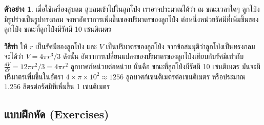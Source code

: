 \documentclass[
]{book}
\theoremstyle{definition}
\theoremstyle{definition}
\newtheorem{example}{ตัวอย่าง}[chapter]
\theoremstyle{definition}
\theoremstyle{definition}
\theoremstyle{remark}
\begin{document}
\begin{example}
เมื่อใช้เครื่องสูบลม สูบลมเข้าไปในลูกโป่ง เราอาจประมาณได้ว่า ณ ขณะเวลาใดๆ
ลูกโป่งมีรูปร่างเป็นรูปทรงกลม จงหาอัตราการเพิ่มขึ้นของปริมาตรของลูกโป่ง
ต่อหนึ่งหน่วยรัศมีที่เพิ่มขึ้นของลูกโป่ง ขณะที่ลูกโป่งมีรัศมี 10 เซนติเมตร
\end{example}

\textbf{วิธีทำ} ให้ \(r\) เป็นรัศมีของลูกโป่ง และ \(V\) เป็นปริมาตรของลูกโป่ง
จากข้อสมมุติว่าลูกโป่งเป็นทรงกลม จะได้ว่า \(V=4\pi r^3/3\) ดังนั้น
อัตราการเปลี่ยนแปลงของปริมาตรของลูกโป่งเทียบกับรัศมีเท่ากับ
\(\displaystyle\frac{dV}{dr}=12\pi r^2/3=4\pi r^2\) ลูกบาศก์หน่วยต่อหน่วย นั่นคือ
ขณะที่ลูกโป่งมีรัศมี 10 เซนติเมตร มันจะมีปริมาตรเพิ่มขึ้นในอัตรา
\(4\times\pi\times10^2\approx1256\) ลูกบาศก์เซนติเมตรต่อเซนติเมตร หรือประมาณ
\(1.256\) ลิตรต่อรัศมีที่เพิ่มขึ้น 1 เซนติเมตร

\subsection{แบบฝึกหัด (Exercises)}\label{uxe41uxe1auxe1auxe1duxe01uxe2buxe14-exercises}
\end{document}
